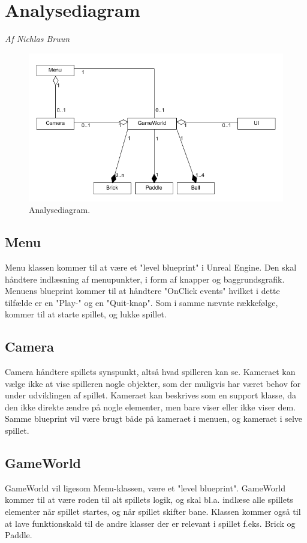 \section{Analysediagram}
\textit{Af Nichlas Bruun}\newline
\begin{figure}
	\begin{center}
		\caption{Analysediagram.}
		\label{dia:analysediagram}
		\includegraphics[width=1.0\linewidth]{pictures/ooa/analysediagram}
	\end{center}
\end{figure}
\subsection{Menu}
Menu klassen kommer til at være et "level blueprint" i Unreal Engine. Den skal håndtere indlæsning af menupunkter, i form af knapper og baggrundsgrafik. Menuens blueprint kommer til at håndtere "OnClick events" hvilket i dette tilfælde er en "Play-" og en "Quit-knap". Som i samme nævnte rækkefølge, kommer til at starte spillet, og lukke spillet.

\subsection{Camera}
Camera håndtere spillets synspunkt, altså hvad spilleren kan se. Kameraet kan vælge ikke at vise spilleren nogle objekter, som der muligvis har været behov for under udviklingen af spillet. Kameraet kan beskrives som en support klasse, da den ikke direkte ændre på nogle elementer, men bare viser eller ikke viser dem. Samme blueprint vil være brugt både på kameraet i menuen, og kameraet i selve spillet.

\subsection{GameWorld}
GameWorld vil ligesom Menu-klassen, være et "level blueprint". GameWorld kommer til at være roden til alt spillets logik, og skal bl.a. indlæse alle spillets elementer når spillet startes, og når spillet skifter bane. Klassen kommer også til at lave funktionskald til de andre klasser der er relevant i spillet f.eks. Brick og Paddle.

